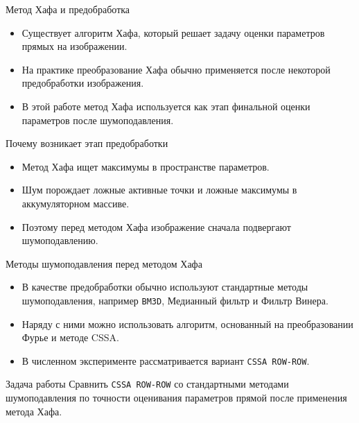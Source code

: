 \documentclass[unicode,notheorems]{beamer}
\begin{document}
\begin{frame}{Метод Хафа и предобработка}
	\begin{itemize}
		\item Существует алгоритм Хафа, который решает задачу оценки параметров прямых на изображении.
		\item На практике преобразование Хафа обычно применяется после некоторой предобработки изображения.
		\item В этой работе метод Хафа используется как этап финальной оценки параметров после шумоподавления.
	\end{itemize}

	\vspace{0.25cm}
	\begin{block}{Почему возникает этап предобработки}
		\begin{itemize}
			\item Метод Хафа ищет максимумы в пространстве параметров.
			\item Шум порождает ложные активные точки и ложные максимумы в аккумуляторном массиве.
			\item Поэтому перед методом Хафа изображение сначала подвергают шумоподавлению.
		\end{itemize}
	\end{block}
\end{frame}

\begin{frame}{Методы шумоподавления перед методом Хафа}
	\begin{itemize}
		\item В качестве предобработки обычно используют стандартные методы шумоподавления, например \texttt{BM3D}, Медианный фильтр и Фильтр Винера.
		\item Наряду с ними можно использовать алгоритм, основанный на преобразовании Фурье и методе CSSA.
		\item В численном эксперименте рассматривается вариант \texttt{CSSA ROW-ROW}.
	\end{itemize}

	\vspace{0.25cm}
	\begin{block}{Задача работы}
		Сравнить \texttt{CSSA ROW-ROW} со стандартными методами шумоподавления по точности оценивания параметров прямой после применения метода Хафа.
	\end{block}
\end{frame}
\end{document}

